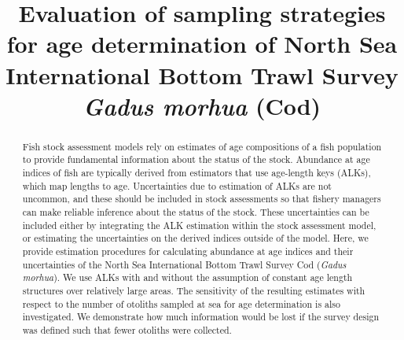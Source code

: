 \documentclass[a4paper 12pt]{article}
\title{\bf 
}
\author{}
\date{}
\numberwithin{equation}{section}
\begin{document}

\title{Evaluation of sampling strategies for age determination of North Sea International Bottom Trawl Survey \textit{Gadus morhua} (Cod)}
\maketitle


\begin{abstract}
Fish stock assessment models rely on estimates of age compositions of a fish population to provide fundamental information about the status of the stock. Abundance at age indices of fish are typically derived from estimators that use age-length keys (ALKs), which map lengths to age. Uncertainties due to estimation of ALKs are not uncommon, and these should be included in stock assessments so that fishery managers can make reliable inference about the status of the stock. These uncertainties can be included either by integrating the ALK estimation within the stock assessment model, or estimating the uncertainties on the derived indices outside of the model. Here, we provide estimation procedures for calculating abundance at age indices and their uncertainties of the North Sea International Bottom Trawl Survey Cod (\textit{Gadus morhua}). We use ALKs with and without the assumption of constant age length structures over relatively large areas. The sensitivity of the resulting estimates with respect to the number of otoliths sampled  at sea for age determination is also investigated. We demonstrate how much information would be lost if the survey design was defined such that fewer otoliths were collected.



\end{abstract}
\end{document}
